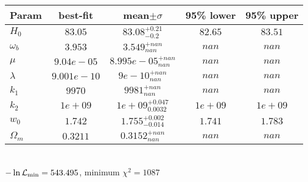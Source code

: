 \begin{tabular}{|l|c|c|c|c|} 
 \hline 
Param & best-fit & mean$\pm\sigma$ & 95\% lower & 95\% upper \\ \hline 
$H_{0 }$ &$83.05$ & $83.08_{-0.2}^{+0.21}$ & $82.65$ & $83.51$ \\ 
$\omega_b$ &$3.953$ & $3.549_{nan}^{+nan}$ & $nan$ & $nan$ \\ 
$\mu$ &$9.04e-05$ & $8.995e-05_{nan}^{+nan}$ & $nan$ & $nan$ \\ 
$\lambda$ &$9.001e-10$ & $9e-10_{nan}^{+nan}$ & $nan$ & $nan$ \\ 
$k_{1 }$ &$9970$ & $9981_{nan}^{+nan}$ & $nan$ & $nan$ \\ 
$k_{2 }$ &$1e+09$ & $1e+09_{0.0032}^{+0.047}$ & $1e+09$ & $1e+09$ \\ 
$w_{0 }$ &$1.742$ & $1.755_{-0.014}^{+0.002}$ & $1.741$ & $1.783$ \\ 
$\Omega_{m }$ &$0.3211$ & $0.3152_{nan}^{+nan}$ & $nan$ & $nan$ \\ 
\hline 
 \end{tabular} \\ 
$-\ln{\cal L}_\mathrm{min} =543.495$, minimum $\chi^2=1087$ \\ 

